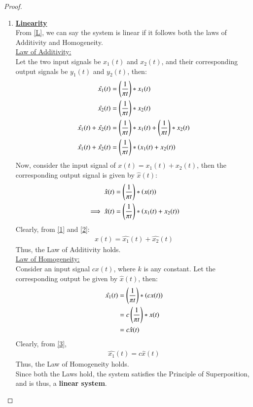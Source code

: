 \documentclass[journal,12pt,twocolumn]{IEEEtran}
\begin{document}
\begin{proof}
\begin{enumerate}
\item \textbf{\underline{Linearity}}\\
From \eqref{L}, we can say the system is linear if it follows both the laws of Additivity and Homogeneity.\\
\underline{Law of Additivity:}\\
Let the two input signals be $x_1(t)$ and $x_2(t)$, and their corresponding output signals be $y_1(t)$ and $y_2(t)$, then:
\begin{align}
    \hat{x_1}(t)&= \left(\frac{1}{\pi t}\right)\ast x_1(t)\\
    \hat{x_2}(t)&= \left(\frac{1}{\pi t}\right)\ast x_2(t)\\
    \nonumber\hat{x_1}(t)+\hat{x_2}(t) &= \left(\frac{1}{\pi t}\right)\ast x_1(t)+\left(\frac{1}{\pi t}\right)\ast x_2(t)\\
    \hat{x_1}(t)+\hat{x_2}(t) &= \left(\frac{1}{\pi t}\right)\ast \left(x_1(t)+x_2(t)\right)
    \label{1}
\end{align}
Now, consider the input signal of $x(t)=x_1(t) + x_2(t)$, then the corresponding output signal is given by $\hat{x}(t)$:
\begin{align}
    \hat{x}(t) &= \left(\frac{1}{\pi t}\right)\ast \left(x(t)\right)\\
    \implies\hat{x}(t) &=\left(\frac{1}{\pi t}\right)\ast \left(x_1(t)+x_2(t)\right)
    \label{2}
\end{align}
Clearly, from \eqref{1} and \eqref{2}:
\begin{align}
    \hat{x}(t) = \hat{x_1}(t) + \hat{x_2}(t)
\end{align}
Thus, the Law of Additivity holds.\\
\underline{Law of Homogeneity: }\\
Consider an input signal $cx(t)$, where $k$ is any constant. Let the corresponding output be given by $\hat{x}(t)$, then:
\begin{align}
    \hat{x_1}(t) &= \left(\frac{1}{\pi t}\right)\ast (cx(t))\\
    &= c\left(\frac{1}{\pi t}\right)\ast x(t)\\
     &= c\hat{x}(t)
     \label{3}
\end{align}
Clearly, from \eqref{3},
\begin{align}
    \hat{x_1}(t) = c\hat{x}(t)
\end{align}
Thus, the Law of Homogeneity holds.\\
Since both the Laws hold, the system satisfies the Principle of Superposition, and is thus, a \textbf{linear system}.


\end{enumerate}
\end{proof}
\end{document}

